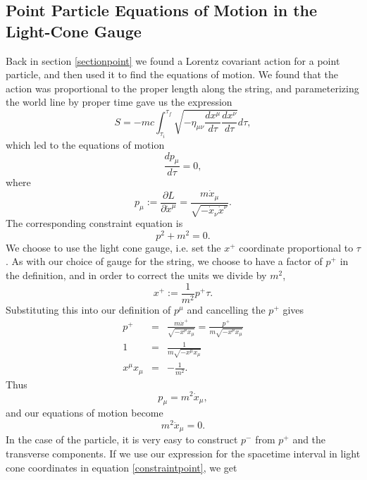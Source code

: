 \documentclass[a4paper,12pt]{article}
\numberwithin{equation}{section}
\begin{document}
\subsection{Point Particle Equations of Motion in the Light-Cone Gauge}
Back in section \ref{sectionpoint} we found a Lorentz covariant action for a point particle, and then used it to find the equations of motion. We found that the action was proportional to the proper length along the string, and parameterizing the world line by proper time gave us the expression
\begin{equation}
S = -mc\int_{\tau_i}^{\tau_f} \sqrt{-\eta_{\mu \nu} \frac{dx^\mu}{d\tau} \frac{dx^\nu}{d\tau}}d\tau,
\end{equation}
which led to the equations of motion
\begin{equation}
\frac{dp_\mu}{d\tau} = 0,
\end{equation}
where
\begin{equation}
p_\mu := \frac{\partial L}{\partial \dot{x}^\mu} = \frac{m\dot{x}_\mu}{\sqrt{-\dot{x}_\nu\dot{x}^\nu}}.
\end{equation}
The corresponding constraint equation is
\begin{equation}\label{constraintpoint}
p^2 + m^2 = 0.
\end{equation}
We choose to use the light cone gauge, i.e. set the $x^+$ coordinate proportional to $\tau$. As with our choice of gauge for the string, we choose to have a factor of $p^+$ in the definition, and in order to correct the units we divide by $m^2$,
\begin{equation}\label{pointeom1}
x^+ := \frac{1}{m^2}p^+\tau.
\end{equation}
Substituting this into our definition of $p^\mu$ and cancelling the $p^+$ gives
\begin{eqnarray}
p^+ &=& \frac{m\dot{x}^+}{\sqrt{-x^\mu x_\mu}} = \frac{p^+}{m\sqrt{-x^\mu x_\mu}}\\
1 &=& \frac{1}{m\sqrt{-x^\mu x_\mu}} \\
x^\mu x_\mu &=& -\frac{1}{m^2}.
\end{eqnarray}
Thus
\begin{equation}\label{pmudefn2}
p_\mu = m^2 \dot{x}_\mu,
\end{equation}
and our equations of motion become
\begin{equation}
m^2\ddot{x}_\mu = 0.
\end{equation}
In the case of the particle, it is very easy to construct $p^-$ from $p^+$ and the transverse components. If we use our expression for the spacetime interval in light cone coordinates in equation \ref{constraintpoint}, we get
\end{document}
